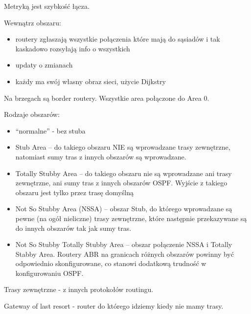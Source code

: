\documentclass[../main.tex]{subfiles}
\begin{document}
    Metryką jest szybkość łącza.

    Wewnątrz obszaru:
    \begin{itemize}
        \item routery zgłaszają wszystkie połączenia które mają do sąsiadów i tak kaskadowo rozsyłają info o wszystkich
        \item updaty o zmianach
        \item każdy ma swój własny obraz sieci, użycie Dijkstry
    \end{itemize}

    Na brzegach są border routery.
    Wszystkie area połączone do Area 0.

    Rodzaje obszarów:
    \begin{itemize}
        \item “normalne” - bez stuba
        \item Stub Area – do takiego obszaru NIE są wprowadzane trasy zewnętrzne, natomiast sumy tras z innych obszarów są wprowadzane.
        \item Totally Stubby Area – do takiego obszaru nie są wprowadzane ani trasy zewnętrzne, ani sumy tras z innych obszarów OSPF. Wyjście z takiego obszaru jest tylko przez trasę domyślną
        \item Not So Stubby Area (NSSA) – obszar Stub, do którego wprowadzane są pewne (na ogół nieliczne) trasy zewnętrzne, które następnie przekazywane są do innych obszarów tak jak sumy tras.
        \item Not So Stubby Totally Stubby Area – obszar połączenie NSSA i Totally Stabby Area. Routery ABR na granicach różnych obszarów powinny być odpowiednio skonfigurowane, co stanowi dodatkową trudność w konfigurowaniu OSPF.
    \end{itemize}
    Trasy zewnętrzne - z innych protokołów routingu.

    Gateway of last resort - router do którego idziemy kiedy nie mamy trasy.
\end{document}
